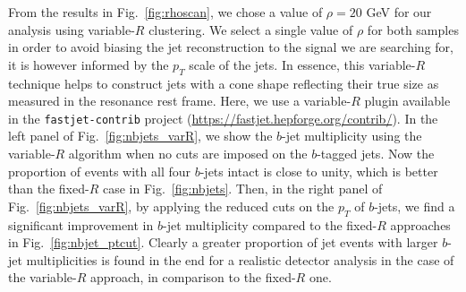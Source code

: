 \documentclass[12pt]{article}
\begin{document}
From the results in Fig.~\ref{fig:rhoscan}, we chose a value of $\rho=20$ GeV for our analysis using variable-$R$ clustering. We select a single value of $\rho$ for both samples in order to avoid biasing the jet reconstruction to the signal we are searching for, it is however informed by the $p_T$ scale of the jets.
In essence, this variable-$R$ technique helps to construct jets with a
cone shape reflecting their true size as measured in the resonance rest frame. Here, we
use a variable-$R$ plugin available in the {\tt fastjet-contrib} project (\url{https://fastjet.hepforge.org/contrib/}). In the left panel of
Fig.~\ref{fig:nbjets_varR}, we show the $b$-jet multiplicity using the variable-$R$ algorithm
when no cuts are imposed on the $b$-tagged jets. Now the proportion of events with all
four $b$-jets intact is close to unity, which is better than the fixed-$R$ case in Fig.~\ref{fig:nbjets}. Then, in the right panel of Fig.~\ref{fig:nbjets_varR}, by applying the reduced cuts on the $p_T$ of $b$-jets, we find a significant improvement
in $b$-jet multiplicity compared to the fixed-$R$ approaches in Fig.~\ref{fig:nbjet_ptcut}.
Clearly a greater proportion of jet events with larger $b$-jet multiplicities is found in the end for a realistic detector analysis in the case of the variable-$R$ approach, in comparison to the fixed-$R$ one.
\end{document}
